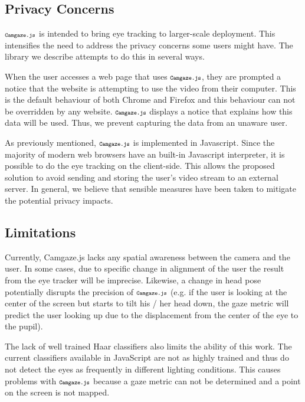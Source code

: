 \documentclass[annual]{acmsiggraph}
\newcommand{\Acronym}[1]{\ensuremath{{\small{\texttt{#1}}}}}
\newcommand{\Name}{\Acronym{Camgaze.js}} \newcommand{\False}{\Constant{false}}
\newcommand{\Constant}[1]{\ensuremath{\small{\texttt{#1}}}}
\begin{document}
\subsection{Privacy Concerns}

$\Name$ is intended to bring eye tracking to larger-scale deployment.  This
intensifies the need to address the privacy concerns some users might have. The
library we describe attempts to do this in several ways.

When the user accesses a web page that uses $\Name$, they are prompted a
notice that the website is attempting to use the video from their computer.
This is the default behaviour of both Chrome and Firefox and this behaviour can
not be overridden by any website. $\Name$ displays a notice that explains how
this data will be used.  Thus, we prevent capturing the data from an unaware
user.

As previously mentioned, $\Name$ is implemented in Javascript. Since the
majority of modern web browsers have an built-in Javascript interpreter, it is
possible to do the eye tracking on the client-side. This allows the proposed
solution to avoid sending and storing the user’s video stream to an external
server. In general, we believe that sensible measures have been taken to
mitigate the potential privacy impacts.

\subsection{Limitations}

Currently, Camgaze.js lacks any spatial awareness between the camera and the
user. In some cases, due to specific change in alignment of the user the result
from the eye tracker will be imprecise. Likewise, a change in head pose
potentially disrupts the precision of $\Name$ (e.g. if the user is looking at
the center of the screen but starts to tilt his / her head down, the gaze
metric will predict the user looking up due to the displacement from the center
of the eye to the pupil).

The lack of well trained Haar classifiers also limits the ability of this work.
The current classifiers available in JavaScript are not as highly trained and
thus do not detect the eyes as frequently in different lighting conditions.
This causes problems with $\Name$ because a gaze metric can not be determined
and a point on the screen is not mapped.

\end{document}
